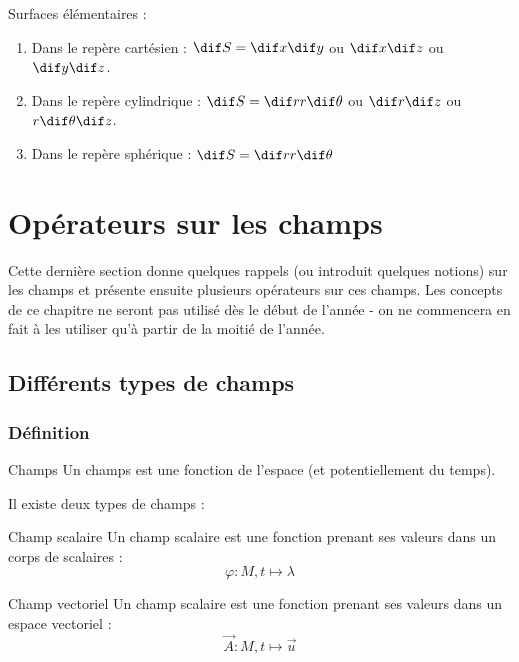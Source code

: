     Surfaces élémentaires :
    
    \begin{enumerate}
        \item Dans le repère cartésien : $\dif S = \dif x \dif y$ ou $\dif x \dif z$ ou $\dif y \dif z$.
        
        \item Dans le repère cylindrique : $\dif S = \dif r r \dif \theta$ ou $\dif r \dif z$ ou $r \dif \theta \dif z$.
        
        \item Dans le repère sphérique : $\dif S = \dif r r \dif \theta$
    \end{enumerate}
    
    \section{Opérateurs sur les champs}
    
    Cette dernière section donne quelques rappels (ou introduit quelques notions) sur les champs et présente ensuite plusieurs opérateurs sur ces champs. Les concepts de ce chapitre ne seront pas utilisé dès le début de l'année - on ne commencera en fait à les utiliser qu'à partir de la moitié de l'année.
    
    \subsection{Différents types de champs}
    
    \subsubsection{Définition}
    
    \begin{definition}{Champs}{}
        Un champs est une fonction de l'espace (et potentiellement du temps).
    \end{definition}
    
    Il existe deux types de champs :
    
    \begin{definition}{Champ scalaire}{}
        Un champ scalaire est une fonction prenant ses valeurs dans un corps de scalaires :
        \[ \varphi : M, t \mapsto \lambda \]
    \end{definition}
    
    \begin{definition}{Champ vectoriel}{}
        Un champ scalaire est une fonction prenant ses valeurs dans un espace vectoriel :
        \[ \vec{A} : M, t \mapsto \vec{u} \]
    \end{definition}
    
